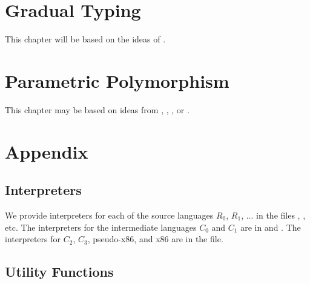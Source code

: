 \documentclass[11pt]{book}
\begin{document}
\chapter{Gradual Typing}
\label{ch:gradual-typing}

This chapter will be based on the ideas of \citet{Siek:2006bh}.

\chapter{Parametric Polymorphism}
\label{ch:parametric-polymorphism}

This chapter may be based on ideas from \citet{Cardelli:1984aa},
\citet{Leroy:1992qb}, \citet{Shao:1997uj}, or \citet{Harper:1995um}.








\chapter{Appendix}

\section{Interpreters}
\label{appendix:interp}

We provide interpreters for each of the source languages $R_0$, $R_1$,
$\ldots$ in the files , , etc.
The interpreters for the intermediate languages $C_0$ and $C_1$ are in
 and .  The interpreters for
$C_2$, $C_3$, pseudo-x86, and x86 are in the  file.

\section{Utility Functions}
\label{appendix:utilities}
\end{document}
